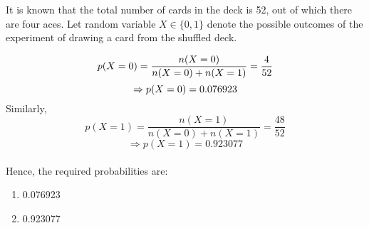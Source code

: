 It is known that the total number of cards in the deck is 52, out of which there are four aces. Let random variable $X \in \{0,1\}$ denote the possible outcomes of the experiment of drawing a card from the shuffled deck.\\
\begin{table}[h]
\caption{Outcome of the Experiment} 
\label{table=1}
\end{table}
\begin{equation}
    p(X=0) = \frac{n(X = 0)}{n(X = 0) + n(X = 1)} = \frac{4}{52}\\
\end{equation}
\begin{equation}
    \Rightarrow p(X=0) = 0.076923\\
\end{equation}
Similarly,\\
\begin{equation}
    p(X = 1) = \frac{n(X=1)}{n(X=0)+n(X=1)} = \frac{48}{52}
\end{equation}
\begin{equation}
    \Rightarrow p(X=1) = 0.923077
\end{equation}
\\Hence, the required probabilities are:
\begin{enumerate}[label=(\roman*)]
    \item 0.076923
    \item 0.923077
\end{enumerate}